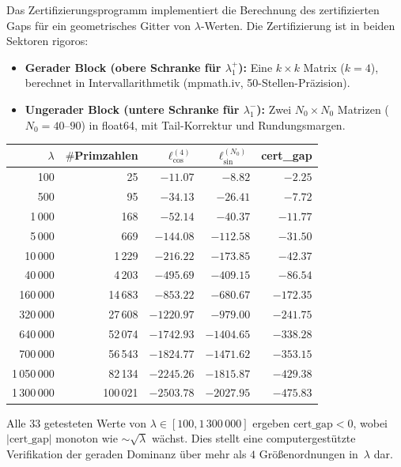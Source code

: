\documentclass[12pt,a4paper]{article}
\theoremstyle{definition}
\theoremstyle{remark}
\begin{document}
Das Zertifizierungsprogramm implementiert die Berechnung des zertifizierten Gaps für ein geometrisches Gitter von $\lambda$-Werten. Die Zertifizierung ist in beiden Sektoren rigoros:
\begin{itemize}
  \item \textbf{Gerader Block (obere Schranke für $\lambda_1^+$):} Eine $k \times k$ Matrix ($k = 4$), berechnet in Intervallarithmetik (mpmath.iv, 50-Stellen-Präzision).
  \item \textbf{Ungerader Block (untere Schranke für $\lambda_1^-$):} Zwei $N_0 \times N_0$ Matrizen ($N_0 = 40$--$90$) in float64, mit Tail-Korrektur und Rundungsmargen.
\end{itemize}

\begin{center}
\renewcommand{\arraystretch}{1.15}
\begin{tabular}{r|r|r|r|r}
$\lambda$ & $\#$Primzahlen & $\ell_{\cos}^{(4)}$ & $\ell_{\sin}^{(N_0)}$ & cert\_gap \\\hline
100   & 25     & $-11.07$ & $-8.82$   & $-2.25$ \\
500   & 95     & $-34.13$ & $-26.41$  & $-7.72$ \\
1\,000 & 168   & $-52.14$ & $-40.37$  & $-11.77$ \\
5\,000 & 669   & $-144.08$ & $-112.58$ & $-31.50$ \\
10\,000 & 1\,229 & $-216.22$ & $-173.85$ & $-42.37$ \\
40\,000 & 4\,203 & $-495.69$ & $-409.15$ & $-86.54$ \\
160\,000 & 14\,683 & $-853.22$ & $-680.67$ & $-172.35$ \\
320\,000 & 27\,608 & $-1220.97$ & $-979.00$ & $-241.75$ \\
640\,000 & 52\,074 & $-1742.93$ & $-1404.65$ & $-338.28$ \\
700\,000 & 56\,543 & $-1824.77$ & $-1471.62$ & $-353.15$ \\
1\,050\,000 & 82\,134 & $-2245.26$ & $-1815.87$ & $-429.38$ \\
1\,300\,000 & 100\,021 & $-2503.78$ & $-2027.95$ & $-475.83$
\end{tabular}
\end{center}

\noindent Alle $33$ getesteten Werte von $\lambda \in [100, 1\,300\,000]$ ergeben $\mathrm{cert\_gap} < 0$, wobei $|\mathrm{cert\_gap}|$ monoton wie $\sim\!\sqrt{\lambda}$ wächst. Dies stellt eine computergestützte Verifikation der geraden Dominanz über mehr als $4$ Größenordnungen in~$\lambda$ dar.
\end{document}
